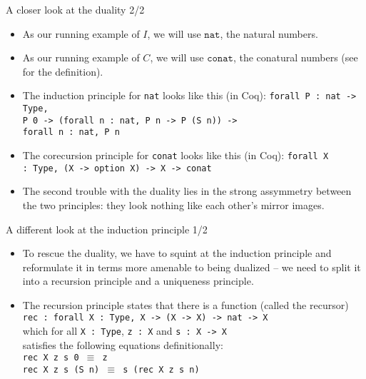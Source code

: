 \documentclass{beamer}
\begin{document}
\begin{frame}{A closer look at the duality 2/2}
\begin{itemize}
  \item As our running example of $I$, we will use $\texttt{nat}$, the natural numbers.
  \item As our running example of $C$, we will use $\texttt{conat}$, the conatural numbers (see \href{https://github.com/wkolowski/Seminar-Bisimulation-and-Coinduction/blob/master/Duality.v}{\color{blue}{here}} for the definition).
  \item The induction principle for \texttt{nat} looks like this (in Coq): \texttt{forall P :\ nat -> Type, \\ P 0 -> (forall n :\ nat, P n -> P (S n)) -> \\ forall n :\ nat, P n}
  \item The corecursion principle for \texttt{conat} looks like this (in Coq): \texttt{forall X :\ Type, (X -> option X) -> X -> conat}
  \item The second trouble with the duality lies in the strong assymmetry between the two principles: they look nothing like each other's mirror images.
\end{itemize}
\end{frame}

\begin{frame}{A different look at the induction principle 1/2}
\begin{itemize}
	\item To rescue the duality, we have to squint at the induction principle and reformulate it in terms more amenable to being dualized -- we need to split it into a recursion principle and a uniqueness principle.
	\item The recursion principle states that there is a function (called the recursor) \\
	\texttt{rec :\ forall X :\ Type, X -> (X -> X) -> nat -> X} \\
  which for all \texttt{X :\ Type}, \texttt{z :\ X} and \texttt{s :\ X -> X} \\
  satisfies the following equations definitionally: \\
	\texttt{rec X z s 0 $\equiv$ z} \\
	\texttt{rec X z s (S n) $\equiv$ s (rec X z s n)} \\
\end{itemize}
\end{frame}
\end{document}
